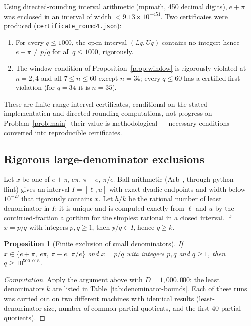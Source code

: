 \documentclass[11pt]{amsart}
\newtheorem{proposition}[theorem]{Proposition}
\theoremstyle{definition}
\theoremstyle{remark}
\numberwithin{equation}{section}
\begin{document}
Using directed-rounding interval arithmetic (mpmath, 450 decimal digits), $e+\pi$ was enclosed in an interval of width $<9.13\times10^{-451}$. Two certificates were produced (\texttt{certificate\_\allowbreak{}round4.json}):
\begin{enumerate}
\item For every $q\le1000$, the open interval $(Lq,Uq)$ contains no integer; hence $e+\pi\ne p/q$ for all $q\le1000$, rigorously.
\item The window condition of Proposition~\ref{prop:window} is rigorously violated at $n=2,4$ and all $7\le n\le60$ except $n=34$; every $q\le60$ has a certified first violation (for $q=34$ it is $n=35$).
\end{enumerate}
These are finite-range interval certificates, conditional on the stated implementation and directed-rounding computations, not progress on Problem~\ref{prob:main}; their value is methodological --- necessary conditions converted into reproducible certificates.

\subsection{Rigorous large-denominator exclusions}\label{sub:denominator-bounds}

Let $x$ be one of $e+\pi$, $e\pi$, $\pi-e$, $\pi/e$. Ball arithmetic
(Arb~\cite{Johansson2017Arb}, through python-flint) gives an interval $I=[\ell,u]$ with exact
dyadic endpoints and width below $10^{-D}$ that rigorously contains $x$. Let $h/k$ be the
rational number of least denominator in $I$; it is unique and is computed exactly from $\ell$
and $u$ by the continued-fraction algorithm for the simplest rational in a closed interval. If
$x=p/q$ with integers $p,q\ge1$, then $p/q\in I$, hence $q\ge k$.

\begin{proposition}[Finite exclusion of small denominators]\label{prop:denominator-bounds}
If $x\in\{e+\pi,\ e\pi,\ \pi-e,\ \pi/e\}$ and $x=p/q$ with integers $p,q$ and $q\ge1$, then $q\ge10^{500{,}018}$.
\end{proposition}

\begin{proof}[Computation]
Apply the argument above with $D=1{,}000{,}000$; the least denominators $k$ are listed in
Table~\ref{tab:denominator-bounds}. Each of these runs was carried out on two different machines
with identical results (least-denominator size, number of common partial quotients, and the
first $40$ partial quotients).
\end{proof}
\end{document}
